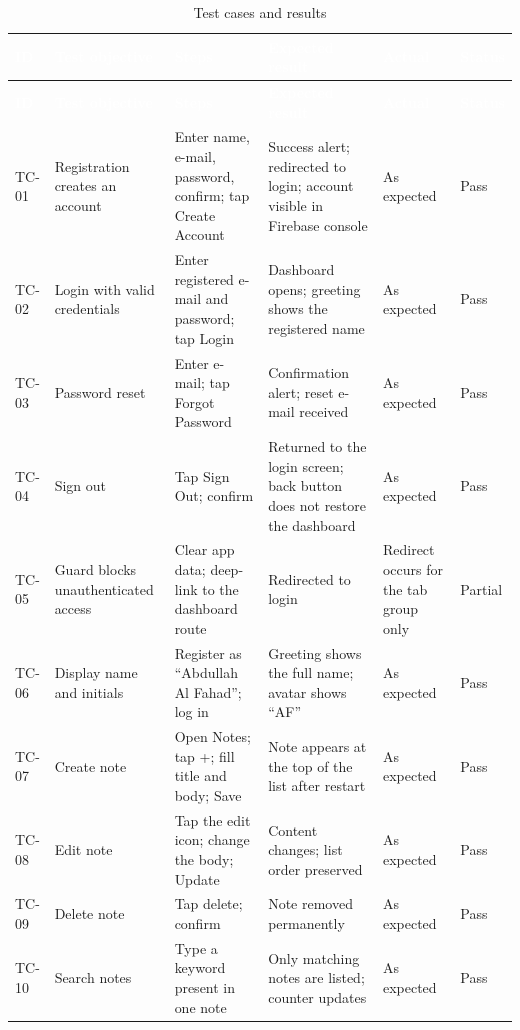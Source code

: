 \documentclass[12pt,a4paper,oneside]{report}
\begin{document}
\begin{landscape}
\begin{longtable}{@{}p{1.3cm}p{3.6cm}p{4.6cm}p{4.0cm}p{1.4cm}p{1.2cm}@{}}
\caption{Test cases and results} \label{tab:tests} \\
\toprule
\rowcolor{tblhead} \textcolor{white}{\textbf{ID}} &
\textcolor{white}{\textbf{Test objective}} &
\textcolor{white}{\textbf{Steps}} &
\textcolor{white}{\textbf{Expected result}} &
\textcolor{white}{\textbf{Actual}} &
\textcolor{white}{\textbf{Status}} \\
\midrule
\endfirsthead
\toprule
\rowcolor{tblhead} \textcolor{white}{\textbf{ID}} &
\textcolor{white}{\textbf{Test objective}} &
\textcolor{white}{\textbf{Steps}} &
\textcolor{white}{\textbf{Expected result}} &
\textcolor{white}{\textbf{Actual}} &
\textcolor{white}{\textbf{Status}} \\
\midrule
\endhead
TC-01 & Registration creates an account & Enter name, e-mail, password, confirm; tap Create Account & Success alert; redirected to login; account visible in Firebase console & As expected & Pass \\
TC-02 & Login with valid credentials & Enter registered e-mail and password; tap Login & Dashboard opens; greeting shows the registered name & As expected & Pass \\
TC-03 & Password reset & Enter e-mail; tap Forgot Password & Confirmation alert; reset e-mail received & As expected & Pass \\
TC-04 & Sign out & Tap Sign Out; confirm & Returned to the login screen; back button does not restore the dashboard & As expected & Pass \\
TC-05 & Guard blocks unauthenticated access & Clear app data; deep-link to the dashboard route & Redirected to login & Redirect occurs for the tab group only & Partial \\
TC-06 & Display name and initials & Register as ``Abdullah Al Fahad''; log in & Greeting shows the full name; avatar shows ``AF'' & As expected & Pass \\
TC-07 & Create note & Open Notes; tap +; fill title and body; Save & Note appears at the top of the list after restart & As expected & Pass \\
TC-08 & Edit note & Tap the edit icon; change the body; Update & Content changes; list order preserved & As expected & Pass \\
TC-09 & Delete note & Tap delete; confirm & Note removed permanently & As expected & Pass \\
TC-10 & Search notes & Type a keyword present in one note & Only matching notes are listed; counter updates & As expected & Pass \\

\end{longtable}
\end{landscape}
\end{document}
